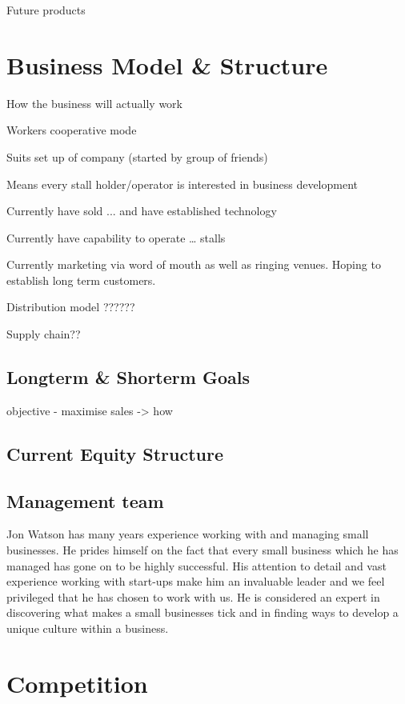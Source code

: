 \documentclass{article}
\begin{document}
  Future products



\section{Business Model \& Structure}
  How the business will actually work

Workers cooperative mode

Suits set up of company (started by group of friends)

Means every stall holder/operator is interested in business development

Currently have sold ... and have established technology

Currently have capability to operate … stalls

Currently marketing via word of mouth as well as ringing venues.
Hoping to establish long term customers.

Distribution model ??????

Supply chain??

  \subsection{Longterm \& Shorterm Goals}

    objective - maximise sales -> how


  \subsection{Current Equity Structure}

  \subsection{Management team}

Jon Watson has many years experience working with and managing small
businesses. He prides himself on the fact that every small business which he has managed has gone on to be highly successful. His attention to detail and vast experience working with start-ups make him an invaluable leader and we feel privileged that he has chosen to work with us. He is considered an expert in discovering what makes a small businesses tick and in finding ways to develop a unique culture within a business.


\section{Competition}
\end{document}
